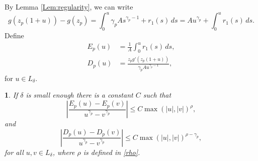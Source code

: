 \documentclass{article}
\numberwithin{equation}{section}
\numberwithin{figure}{section}
\theoremstyle{plain}
\theoremstyle{plain}
\newtheorem{lemma}[thm]{\protect\lemmaname}
\numberwithin{thm}{section}
\theoremstyle{remark}
\providecommand{\lemmaname}{Lemma}
\let \le \leqslant
\begin{document}
By Lemma \ref{Lem:regularity}, we can write
\begin{equation}\label{psiEp}
g(z_p(1+u))-g(z_p)=\int_0^u\gamma_pAs^{\gamma_p-1}+r_1(s)\,ds=Au^{\gamma_p}+\int_0^u r_1(s)\,ds.
\end{equation}
Define
\begin{align}\label{Ep}
E_p(u)&=\frac 1A\int_0^u r_1(s)\,ds,\\
D_p(u)&=\frac{z_pg'(z_p(1+u))}{\gamma_p Au^{\gamma_p-1}},\label{Dp}
\end{align}
for $u\in  L_\delta$.

\begin{lemma}\label{Lem:EpDp}
If $\delta$ is small enough there is a constant $C$ such that
\begin{equation}\label{Epest}
\left|\frac{E_p(u)-E_p(v)}{u^{\gamma_p}-v^{\gamma_p}}\right|\le C\max(|u|,|v|)^\rho,
\end{equation}
and
\begin{equation}\label{Dpest}
\left|\frac{D_p(u)-D_p(v)}{u^{\gamma_p}-v^{\gamma_p}}\right|\le C\max(|u|,|v|)^{\rho-\gamma_p},
\end{equation}
for all $u, v \in  L_\delta$, where $\rho$ is defined in \eqref{rho}.
\end{lemma}
\end{document}
